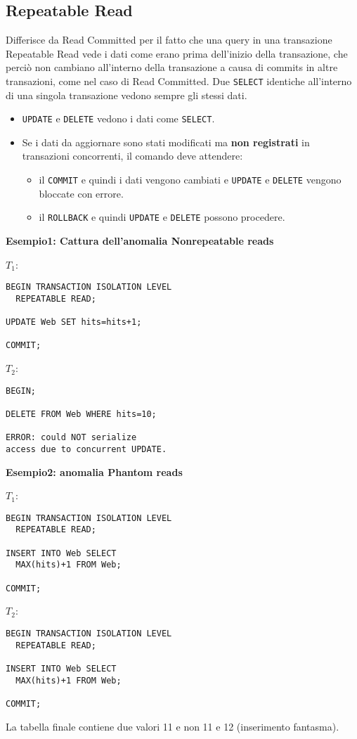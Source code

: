 \documentclass[a4paper, 10pt, titlepage]{article}
\begin{document}
		\subsection{Repeatable Read}
			Differisce da Read Committed per il fatto che una query in una transazione Repeatable Read vede i dati come erano prima dell'inizio della transazione, che perciò non cambiano all'interno della transazione a causa di commits in altre transazioni, come nel caso di Read Committed. Due \lstinline|SELECT| identiche all'interno di una singola transazione vedono sempre gli stessi dati.
			\begin{itemize}
				\item \lstinline|UPDATE| e \lstinline|DELETE| vedono i dati come \lstinline|SELECT|.
				\item Se i dati da aggiornare sono stati modificati ma \textbf{non registrati} in transazioni concorrenti, il comando deve attendere: 
				\begin{itemize}
					\item il \lstinline|COMMIT| e quindi i dati vengono cambiati e \lstinline|UPDATE| e \lstinline|DELETE| vengono bloccate con errore.
					\item il \lstinline|ROLLBACK| e quindi \lstinline|UPDATE| e \lstinline|DELETE| possono procedere.
				\end{itemize}
			\end{itemize}
			
			\noindent
			\textbf{Esempio1: Cattura dell'anomalia Nonrepeatable reads}
			\begin{multicols}{2}
			\noindent
			$ T_1 $:
			\begin{lstlisting}
BEGIN TRANSACTION ISOLATION LEVEL
  REPEATABLE READ;

UPDATE Web SET hits=hits+1;

COMMIT;
			\end{lstlisting}
			\columnbreak
			$ T_2 $:
			\begin{lstlisting}
BEGIN;

DELETE FROM Web WHERE hits=10;

ERROR: could NOT serialize 
access due to concurrent UPDATE.
			\end{lstlisting}
			\end{multicols}
			\noindent
			\textbf{Esempio2: anomalia Phantom reads}
			\begin{multicols}{2}
			\noindent
			$ T_1 $:
			\begin{lstlisting}
BEGIN TRANSACTION ISOLATION LEVEL
  REPEATABLE READ;
 
INSERT INTO Web SELECT
  MAX(hits)+1 FROM Web;
  
COMMIT;
			\end{lstlisting}
			\columnbreak
			$ T_2 $:
			\begin{lstlisting}
BEGIN TRANSACTION ISOLATION LEVEL
  REPEATABLE READ;

INSERT INTO Web SELECT
  MAX(hits)+1 FROM Web;

COMMIT;
			\end{lstlisting}
			\end{multicols}
La tabella finale contiene due valori 11 e non 11 e 12 (inserimento fantasma).
		
\end{document}
